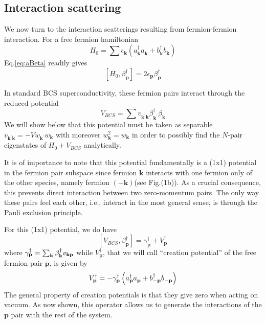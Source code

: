 \documentclass[epj]{svjour}
\newcommand{\vk}{\ensuremath{\mathbf{k}}}
\newcommand{\vp}{\ensuremath{\mathbf{p}}}
\begin{document}
\subsection{Interaction scattering}

We now turn to the interaction scatterings resulting from fermion-fermion interaction. For a free fermion hamiltonian 
\begin{equation}  \label{eq:h0}
H_0=\sum{\epsilon_\vk\left(a^{\dagger}_{\mathbf{k} } a^{}_{\mathbf{k}
}+b^{\dagger}_{\mathbf{k} } b^{}_{\mathbf{k} }\right) }
\end{equation}
Eq.\eqref{eq:aBeta} readily gives 
\begin{equation}  \label{eq:betaH}
\left[H_0,\beta^{\dagger}_\vp\right]  =2\epsilon_\vp\beta^{\dagger}_\vp
\end{equation}

In  standard BCS superconductivity, these fermion pairs interact through the reduced potential
\begin{equation}  \label{eq:vbcs}
V_{BCS}=\sum{v_{\mathbf{k} ^{\prime}\mathbf{k} }\beta^{\dagger}_{\mathbf{k}
^{\prime}}\beta^{}_{\mathbf{k} }}
\end{equation}
We will show below that this potential must be taken as separable $v_{\mathbf{k} ^{\prime}\mathbf{k}}=-Vw_{\mathbf{k} ^{\prime} }w_\vk$ with moreover $w_\vk^2=w_\vk$ in order to possibly find the $N$-pair eigenstates of $H_0+V_{BCS}$ analytically.


It is of importance to note that this potential fundamentally is a (1x1) potential in the fermion pair subspace since fermion $\mathbf{k}$ 
interacts with one fermion only of the other
species, namely fermion $\left(-\mathbf{k} \right)$(see Fig.(1b)). As a crucial consequence, this prevents direct interaction between two zero-momentum pairs. The only way these pairs feel each other, i.e., interact in the most general sense, is through the Pauli exclusion principle. 


  For this (1x1)
potential, we do have 
\begin{equation}  \label{eq:vbeta}
\left[V_{BCS},\beta^{\dagger}_\vp\right] 
=\gamma^{\dagger}_\vp+V^{\dagger}_\vp
\end{equation}
where $\gamma^{\dagger}_\vp=\sum_\vk\beta^{\dagger}_\vk{}v_{%
\mathbf{k} \mathbf{p} }$ while $V^{\dagger}_\vp$, that we will call ``creation potential''  of the free fermion pair 
$\mathbf{p} $, is given by 
\begin{equation}  \label{eq:betaV}
V^{\dagger}_\vp=-{\gamma^{\dagger}_\vp}\left(a^{\dagger}_{\mathbf{p} }a^{}_{%
\mathbf{p} }+b^{\dagger}_{-\mathbf{p} }b^{}_{-\mathbf{p} }\right) 
\end{equation}
The general property of creation potentials is that they give zero when acting on vacuum. As now shown, this operator allows us to generate the interactions of the $\vp$ pair with the rest of the system.
\end{document}
